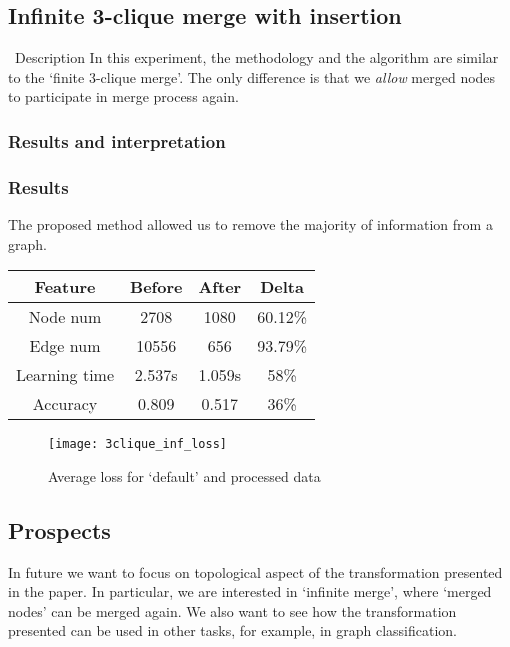 \subsection{Infinite 3-clique merge with insertion}

\begin{frame}{\subsecname\ Description}
	In this experiment, the methodology and the algorithm are similar to the `finite 3-clique merge'.
	The only difference is that we \emph{allow} merged nodes to participate in merge process again.
\end{frame}

\subsubsection*{Results and interpretation}
\begin{frame}[allowframebreaks]
	\frametitle{Results}
	The proposed method allowed us to remove the majority of information from a graph.

	\centering
	\begin{tabular}{ |c|c|c|c| }
		\hline
		Feature       & Before & After  & Delta   \\
		\hline
		Node num      & 2708   & 1080   & 60.12\% \\
		Edge num      & 10556  & 656    & 93.79\% \\
		Learning time & 2.537s & 1.059s & 58\%    \\
		Accuracy      & 0.809  & 0.517  & 36\%    \\
		\hline
	\end{tabular}

	\framebreak

	\begin{figure}[h]
		\centering
		\texttt{[image: 3clique\_inf\_loss]}
		\caption{Average loss for `default' and processed data}
	\end{figure}
\end{frame}

\subsection{Prospects}
\begin{frame}{\subsecname}
	In future we want to focus on topological aspect of the transformation presented in the paper.
	In particular, we are interested in `infinite merge', where `merged nodes' can be merged again.
	We also want to see how the transformation presented can be used in other tasks, for example, in graph classification.
\end{frame}
